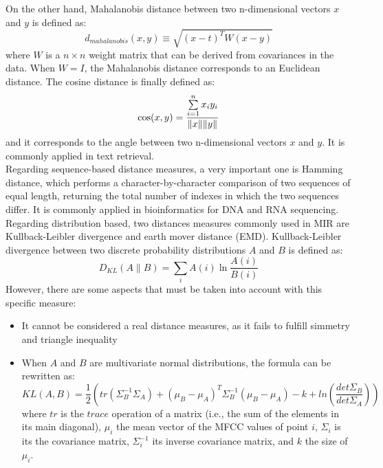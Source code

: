 On the other hand, Mahalanobis distance between two n-dimensional vectors $x$ and $y$ is defined as:
\begin{equation}
d_{mahalanobis}(x,y) \equiv \sqrt{(x-t)^{T}W(x-y)}
\end{equation}
where $W$ is a $n \times n$ weight matrix that can be derived from covariances in the data. When $W = I$, the Mahalanobis distance corresponds to an Euclidean distance.
The cosine distance is finally defined as:
\begin{equation}
\cos(x,y) = \frac{\sum\limits_{i=1}^{n} x_iy_i}{\lVert x\rVert\lVert y\rVert}
\end{equation}
and it corresponds to the angle between two n-dimensional vectors $x$ and $y$. It is commonly applied in text retrieval.\\
Regarding sequence-based distance measures, a very important one is Hamming distance, which performs a character-by-character comparison of two sequences of equal length, returning the total number of indexes in which the two sequences differ. It is commonly applied in bioinformatics for DNA and RNA sequencing. \\

Regarding distribution based, two distances measures commonly used in MIR are Kullback-Leibler divergence and earth mover distance (EMD). 
Kullback-Leibler divergence between two discrete probability distributions $A$ and $B$ is defined as:
\begin{equation}
D_{KL}(A \lVert B) = \sum\limits_{i}^{} A(i) \ln \frac{A(i)}{B(i)}
\end{equation} 
However, there are some aspects that must be taken into account with this specific measure:
\begin{itemize}
\item It cannot be considered a real distance measures, as it fails to fulfill simmetry and triangle inequality
\item When $A$ and $B$ are multivariate normal distributions, the formula can be rewritten as:
\begin{equation}
KL(A, B) = \frac{1}{2}\left(tr(\Sigma_{B}^{-1}\Sigma_{A}) + (\mu_{B} - \mu_{A})^T \Sigma_{B}^{-1}(\mu_{B} - \mu_{A}) - k + ln\left(\frac{det\Sigma_{B}}{det\Sigma_{A}}\right)\right)
\label{eq:kl_norm}
\end{equation}
where $tr$ is the $trace$ operation of a matrix (i.e., the sum of the elements in its main diagonal), $\mu_i$ the mean vector of the MFCC values of point $i$, $\Sigma_i$ is its the covariance matrix, $\Sigma_i^{-1}$ its inverse covariance matrix, and $k$ the size of $\mu_i$. 
\end{itemize}

